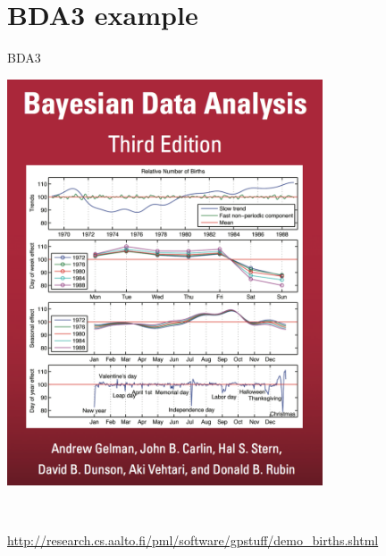 \documentclass[11pt,ignorenonframetext,]{beamer}
\begin{document}
\hypertarget{bda3-example}{%
\section{BDA3 example}\label{bda3-example}}

\begin{frame}{BDA3}
\protect\hypertarget{bda3}{}

\begin{center}
\includegraphics[width=0.7\textwidth]{figs/bda_cover.png} 

$~$

\vspace{-3mm}
\url{http://research.cs.aalto.fi/pml/software/gpstuff/demo_births.shtml}
\end{center}

\end{frame}
\end{document}
